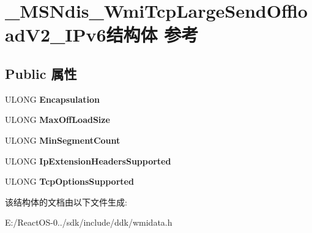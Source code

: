 \hypertarget{struct___m_s_ndis___wmi_tcp_large_send_offload_v2___i_pv6}{}\section{\+\_\+\+M\+S\+Ndis\+\_\+\+Wmi\+Tcp\+Large\+Send\+Offload\+V2\+\_\+\+I\+Pv6结构体 参考}
\label{struct___m_s_ndis___wmi_tcp_large_send_offload_v2___i_pv6}
\subsection*{Public 属性}
\begin{DoxyCompactItemize}
\item 
\mbox{\label{struct___m_s_ndis___wmi_tcp_large_send_offload_v2___i_pv6_a75e0b0ea6be38038f237e48e2c37db21}} 
U\+L\+O\+NG {\bfseries Encapsulation}
\item 
\mbox{\label{struct___m_s_ndis___wmi_tcp_large_send_offload_v2___i_pv6_ab4d030788b0994ee7be7b9429b9f8e67}} 
U\+L\+O\+NG {\bfseries Max\+Off\+Load\+Size}
\item 
\mbox{\label{struct___m_s_ndis___wmi_tcp_large_send_offload_v2___i_pv6_aa9ff597dcb198a91184aa02105d95a34}} 
U\+L\+O\+NG {\bfseries Min\+Segment\+Count}
\item 
\mbox{\label{struct___m_s_ndis___wmi_tcp_large_send_offload_v2___i_pv6_aff6fc1b84b6963ffd022dca9c29963e1}} 
U\+L\+O\+NG {\bfseries Ip\+Extension\+Headers\+Supported}
\item 
\mbox{\label{struct___m_s_ndis___wmi_tcp_large_send_offload_v2___i_pv6_ab7a9136d6ac03a87d2e3c79e9304885e}} 
U\+L\+O\+NG {\bfseries Tcp\+Options\+Supported}
\end{DoxyCompactItemize}


该结构体的文档由以下文件生成\+:\begin{DoxyCompactItemize}
\item 
E\+:/\+React\+O\+S-\/0../sdk/include/ddk/wmidata.\+h\end{DoxyCompactItemize}
